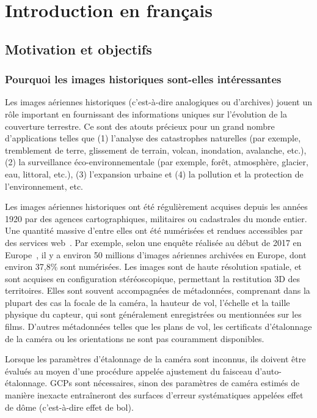 
\chapter{Introduction en français}
\label{chap:introFrench}
\minitoc

\section{Motivation et objectifs}
\subsection{Pourquoi les images historiques sont-elles intéressantes}
Les images aériennes historiques (c'est-à-dire analogiques ou d'archives) jouent un rôle important en fournissant des informations uniques sur l'évolution de la couverture terrestre. 
Ce sont des atouts précieux pour un grand nombre d'applications telles que (1) l'analyse des catastrophes naturelles (par exemple, tremblement de terre, glissement de terrain, volcan, inondation, avalanche, etc.), (2) la surveillance éco-environnementale (par exemple, forêt, atmosphère, glacier, eau, littoral, etc.), (3) l'expansion urbaine et (4) la pollution et la protection de l'environnement, etc.
\par
Les images aériennes historiques ont été régulièrement acquises depuis les années 1920 par des agences cartographiques, militaires ou cadastrales du monde entier. Une quantité massive d'entre elles ont été numérisées et rendues accessibles par des services web~\cite{sebastien2019archiving,earthexplorer,remonterletemps}. 
Par exemple, selon une enquête réalisée au début de 2017 en Europe~\cite{sebastien2019archiving}, il y a environ 50 millions d'images aériennes archivées en Europe, dont environ 37,8\% sont numérisées. 
Les images sont de haute résolution spatiale, et sont acquises en configuration stéréoscopique, permettant la restitution 3D des territoires. 
Elles sont souvent accompagnées de métadonnées, comprenant dans la plupart des cas la focale de la caméra, la hauteur de vol, l'échelle et la taille physique du capteur, qui sont généralement enregistrées ou mentionnées sur les films. D'autres métadonnées telles que les plans de vol, les certificats d'étalonnage de la caméra ou les orientations ne sont pas couramment disponibles. 
\par
Lorsque les paramètres d'étalonnage de la caméra sont inconnus, ils doivent être évalués au moyen d'une procédure appelée ajustement du faisceau d'auto-étalonnage. \ac{GCP}s sont nécessaires, sinon des paramètres de caméra estimés de manière inexacte entraîneront des surfaces d'erreur systématiques appelées effet de dôme (c'est-à-dire effet de bol).

